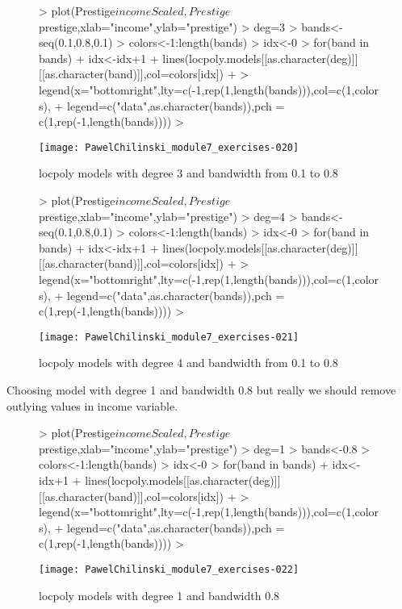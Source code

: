 \documentclass[a4paper]{article}
\begin{document}
\begin{itemize}
\begin{figure}[H]
\begin{center}
\begin{Schunk}
\begin{Sinput}
> plot(Prestige$incomeScaled,Prestige$prestige,xlab="income",ylab="prestige")
> deg=3
> bands<-seq(0.1,0.8,0.1)
> colors<-1:length(bands)
> idx<-0
> for(band in bands){
+ 	idx<-idx+1
+ 	lines(locpoly.models[[as.character(deg)]][[as.character(band)]],col=colors[idx])		
+ }
> legend(x="bottomright",lty=c(-1,rep(1,length(bands))),col=c(1,colors), 
+ 		legend=c("data",as.character(bands)),pch = c(1,rep(-1,length(bands))))
> 
\end{Sinput}
\end{Schunk}
\texttt{[image: PawelChilinski\_module7\_exercises-020]}
\caption{locpoly models with degree 3 and bandwidth from 0.1 to 0.8}
\end{center}
\end{figure}

\begin{figure}[H]
\begin{center}
\begin{Schunk}
\begin{Sinput}
> plot(Prestige$incomeScaled,Prestige$prestige,xlab="income",ylab="prestige")
> deg=4
> bands<-seq(0.1,0.8,0.1)
> colors<-1:length(bands)
> idx<-0
> for(band in bands){
+ 	idx<-idx+1
+ 	lines(locpoly.models[[as.character(deg)]][[as.character(band)]],col=colors[idx])		
+ }
> legend(x="bottomright",lty=c(-1,rep(1,length(bands))),col=c(1,colors), 
+ 		legend=c("data",as.character(bands)),pch = c(1,rep(-1,length(bands))))
> 
\end{Sinput}
\end{Schunk}
\texttt{[image: PawelChilinski\_module7\_exercises-021]}
\caption{locpoly models with degree 4 and bandwidth from 0.1 to 0.8}
\end{center}
\end{figure}

Choosing model with degree 1 and bandwidth 0.8 but really we should remove
outlying values in income variable.
\begin{figure}[H]
\begin{center}
\begin{Schunk}
\begin{Sinput}
> plot(Prestige$incomeScaled,Prestige$prestige,xlab="income",ylab="prestige")
> deg=1
> bands<-0.8
> colors<-1:length(bands)
> idx<-0
> for(band in bands){
+ 	idx<-idx+1
+ 	lines(locpoly.models[[as.character(deg)]][[as.character(band)]],col=colors[idx])		
+ }
> legend(x="bottomright",lty=c(-1,rep(1,length(bands))),col=c(1,colors), 
+ 		legend=c("data",as.character(bands)),pch = c(1,rep(-1,length(bands))))
> 
\end{Sinput}
\end{Schunk}
\texttt{[image: PawelChilinski\_module7\_exercises-022]}
\caption{locpoly models with degree 1 and bandwidth 0.8}
\end{center}
\end{figure}


\end{itemize}
\end{document}
